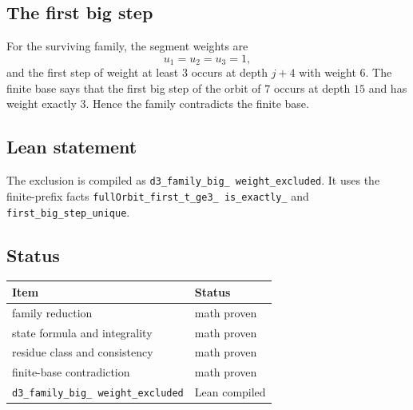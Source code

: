 \subsection{The first big step}

For the surviving family, the segment weights are
\begin{equation*}
  u_1=u_2=u_3=1,
\end{equation*}
and the first step of weight at least $3$ occurs at depth $j+4$ with
weight $6$.  The finite base says that the first big step of the orbit
of $7$ occurs at depth $15$ and has weight exactly $3$.  Hence the
family contradicts the finite base.

\subsection{Lean statement}

The exclusion is compiled as
\texttt{d3\_\allowbreak family\_\allowbreak big\_\allowbreak
weight\_\allowbreak excluded}.  It uses the finite-prefix facts
\texttt{fullOrbit\_\allowbreak first\_\allowbreak t\_\allowbreak ge3\_
\allowbreak is\_\allowbreak exactly\_} and
\texttt{first\_\allowbreak big\_\allowbreak step\_\allowbreak unique}.

\subsection{Status}

\begin{center}
\small
\begin{tabular}{@{}p{}p{}@{}}
\toprule
Item & Status \\
\midrule
family reduction & math proven \\
state formula and integrality & math proven \\
residue class and consistency & math proven \\
finite-base contradiction & math proven \\
\texttt{d3\_\allowbreak family\_\allowbreak big\_\allowbreak
weight\_\allowbreak excluded} & Lean compiled \\
\bottomrule
\end{tabular}
\end{center}
